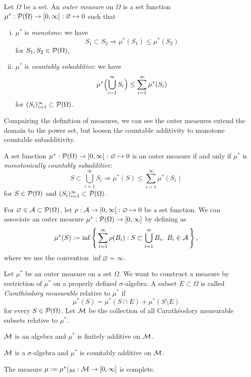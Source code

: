 \documentclass{../../large}
\begin{document}
\begin{prb}
Let $\Omega$ be a set.
An \emph{outer measure} on $\Omega$ is a set function $\mu^*:\mathcal{P}(\Omega)\to[0,\infty]:\varnothing\mapsto0$ such that
\begin{enumerate}[(i)]
\item $\mu^*$ is \emph{monotone}: we have
\[S_1\subset S_2\Rightarrow\mu^*(S_1)\le\mu^*(S_2)\]
for $S_1,S_2\in\mathcal{P}(\Omega)$,
\item $\mu^*$ is \emph{countably subadditive}: we have
\[\mu^*\Bigl(\bigcup_{i=1}^\infty S_i\Bigr)\le\sum_{i=1}^\infty\mu^*(S_i)\]
for $(S_i)_{i=1}^\infty\subset\mathcal{P}(\Omega)$.
\end{enumerate}
Compairing the definition of measures, we can see the outer measures extend the domain to the power set, but loosen the countable additivity to monotone countable subadditivity.
\begin{parts}
\item A set function $\mu^*:\mathcal{P}(\Omega)\to[0,\infty]:\varnothing\mapsto0$ is an outer measure if and only if $\mu^*$ is \emph{monotonically countably subadditive}:
\[S\subset\bigcup_{i=1}^\infty S_i\Rightarrow\mu^*(S)\le\sum_{i=1}^\infty\mu^*(S_i)\]
for $S\in\mathcal{P}(\Omega)$ and $(S_i)_{i=1}^\infty\subset\mathcal{P}(\Omega)$.
\item
For $\varnothing\in\mathcal{A}\subset\mathcal{P}(\Omega)$, let $\rho:\mathcal{A}\to[0,\infty]:\varnothing\mapsto0$ be a set function.
We can associate an outer measure $\mu^*:\mathcal{P}(\Omega)\to[0,\infty]$ by defining as
\[\mu^*(S):=\inf\left\{\,\sum_{i=1}^\infty\rho(B_i):S\subset\bigcup_{i=1}^\infty B_i,\ B_i\in\mathcal{A}\,\right\},\]
where we use the convention $\inf\varnothing=\infty$.
\end{parts}
\end{prb}
\begin{pf}
\end{pf}


\begin{prb}
Let $\mu^*$ be an outer measure on a set $\Omega$.
We want to construct a measure by restriction of $\mu^*$ on a properly defined $\sigma$-algebra.
A subset $E\subset\Omega$ is called \emph{Carath\'eodory measurable} relative to $\mu^*$ if
\[\mu^*(S)=\mu^*(S\cap E)+\mu^*(S\setminus E)\]
for every $S\in\mathcal{P}(\Omega)$.
Let $\mathcal{M}$ be the collection of all Carath\'eodory measurable subsets relative to $\mu^*$.
\begin{parts}
\item $\mathcal{M}$ is an algebra and $\mu^*$ is finitely additive on $\mathcal{M}$.
\item $\mathcal{M}$ is a $\sigma$-algebra and $\mu^*$ is countably additive on $\mathcal{M}$.
\item The measure $\mu:=\mu^*|_{\mathcal{M}}:\mathcal{M}\to[0,\infty]$ is complete.
\end{parts}
\end{prb}
\begin{pf}
\end{pf}
\end{document}
